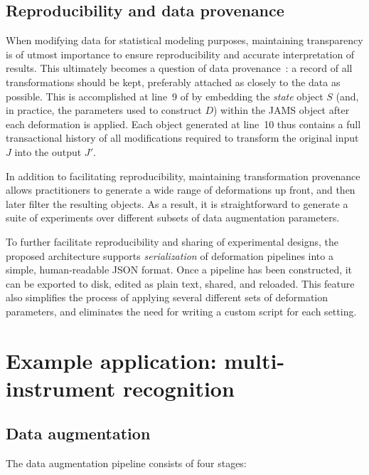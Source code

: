 \documentclass{article}
\begin{document}
\subsection{Reproducibility and data provenance}
When modifying data for statistical modeling purposes, maintaining transparency is of
utmost importance to ensure reproducibility and accurate interpretation of results.
This ultimately becomes a question of data provenance~\cite{buneman2000data}: a record of
all transformations should be kept, preferably attached as closely to the data as
possible.  This is accomplished at line~9 of  by embedding the 
\emph{state} object $S$ (and, in practice, the parameters used to construct $D$) within the JAMS object after each deformation is applied.  
Each object generated at line~10 thus contains a full transactional history of all
modifications required to transform the original input $J$ into the output $J'$.

In addition to facilitating reproducibility, maintaining transformation provenance allows
practitioners to generate a wide range of deformations up front, and then later filter the
resulting objects.  As a result, it is straightforward to generate a suite of experiments
over different subsets of data augmentation parameters.

To further facilitate reproducibility and sharing of experimental designs, the proposed
architecture supports \emph{serialization} of deformation pipelines into a simple,
human-readable JSON format.  Once a pipeline has been constructed, it can be exported to
disk, edited as plain text, shared, and reloaded.  This feature also simplifies the
process of applying several different sets of deformation parameters, and eliminates the
need for writing a custom script for each setting.

\section{Example application: multi-instrument recognition}

\cite{bittner2014medleydb}

\subsection{Data augmentation}

The data augmentation pipeline consists of four stages:
\end{document}
